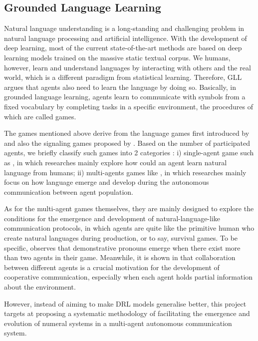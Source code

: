 \documentclass[a4paper,11pt]{article}
\begin{document}
\subsection{Grounded Language Learning}
\label{ssec:2.2ma_gll}

Natural language understanding is a long-standing and challenging problem in natural language processing and artificial intelligence. With the development of deep learning, most of the current state-of-the-art methods are based on deep learning models trained on the massive static textual corpus. We humans, however, learn and understand languages by interacting with others and the real world, which is a different paradigm from statistical learning. Therefore, GLL argues that agents also need to learn the language by doing so. Basically, in grounded language learning, agents learn to communicate with symbols from a fixed vocabulary by completing tasks in a specific environment, the procedures of which are called games.

The games mentioned above derive from the language games first introduced by \cite{wittgenstein2009philosophical} and also the signaling games proposed by \cite{lewis2008convention}. Based on the number of participated agents, we briefly classify such games into 2 categories : i) single-agent game such as \cite{hermann2017grounded, yu2018interactive, das2018embodied}, in which researches mainly explore how could an agent learn natural language from humans; ii) multi-agents games like \cite{mordatch2018emergence, havrylov2017emergence}, in which researches mainly focus on how language emerge and develop during the autonomous communication between agent population.

As for the multi-agent games themselves, they are mainly designed to explore the conditions for the emergence and development of natural-language-like communication protocols, in which agents are quite like the primitive human who create natural languages during production, or to say, survival games. To be specific, \cite{mordatch2018emergence} observes that demonstrative pronouns emerge when there exist more than two agents in their game. Meanwhile, it is shown in \cite{jaques2018intrinsic} that collaboration between different agents is a crucial motivation for the development of cooperative communication, especially when each agent holds partial information about the environment.

However, instead of aiming to make DRL models generalise better, this project targets at proposing a systematic methodology of facilitating the emergence and evolution of numeral systems in a multi-agent autonomous communication system.
\end{document}
